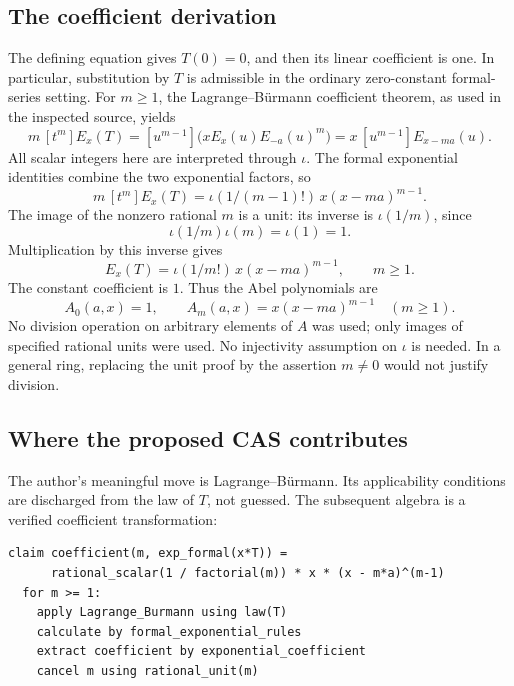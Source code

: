 \documentclass[11pt,letterpaper]{article}
\numberwithin{equation}{section}
\begin{document}
\subsection{The coefficient derivation}
The defining equation gives $T(0)=0$, and then its linear coefficient is one.
In particular, substitution by $T$ is admissible in the ordinary zero-constant
formal-series setting. For $m\ge1$, the Lagrange--B\"urmann coefficient theorem,
as used in the inspected source, yields
\begin{equation}
 m\,[t^m]E_x(T)
   =[u^{m-1}]\bigl(xE_x(u)E_{-a}(u)^m\bigr)
   =x\,[u^{m-1}]E_{x-ma}(u).                          \label{eq:lagrange}
\end{equation}
All scalar integers here are interpreted through $\iota$. The formal
exponential identities combine the two exponential factors, so
\[
 m\,[t^m]E_x(T)=\iota(1/(m-1)!)\,x(x-ma)^{m-1}.
\]
The image of the nonzero rational $m$ is a unit: its inverse is $\iota(1/m)$,
since
\[
 \iota(1/m)\iota(m)=\iota(1)=1.
\]
Multiplication by this inverse gives
\begin{equation}
 [t^m]E_x(T)=\iota(1/m!)\,x(x-ma)^{m-1},\qquad m\ge1. \label{eq:abelcoeff}
\end{equation}
The constant coefficient is $1$. Thus the Abel polynomials are
\[
 A_0(a,x)=1,\qquad A_m(a,x)=x(x-ma)^{m-1}\quad(m\ge1).
\]
No division operation on arbitrary elements of $A$ was used; only images of
specified rational units were used. No injectivity assumption on $\iota$ is
needed. In a general ring, replacing the unit proof by the assertion $m\ne0$
would not justify division.

\subsection{Where the proposed CAS contributes}
The author's meaningful move is Lagrange--B\"urmann. Its applicability conditions
are discharged from the law of $T$, not guessed. The subsequent algebra is a
verified coefficient transformation:
\par\noindent\begin{minipage}{\linewidth}
\begin{lstlisting}
claim coefficient(m, exp_formal(x*T)) =
      rational_scalar(1 / factorial(m)) * x * (x - m*a)^(m-1)
  for m >= 1:
    apply Lagrange_Burmann using law(T)
    calculate by formal_exponential_rules
    extract coefficient by exponential_coefficient
    cancel m using rational_unit(m)
\end{lstlisting}
\end{minipage}\par
\end{document}
